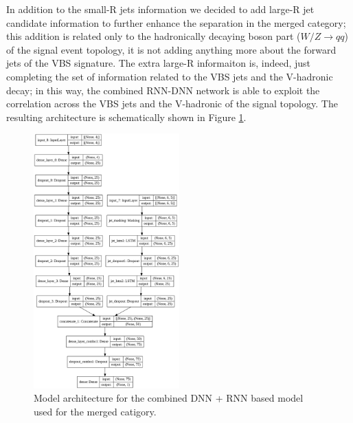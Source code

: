 In addition to the small-R jets information we decided to add large-R jet candidate information to further enhance the separation in the merged category; this addition is related only to the hadronically decaying boson part ($W/Z \rightarrow qq$) of the signal event topology, it is not adding anything more about the forward jets of the VBS signature.
The extra large-R informaiton is, indeed, just completing the set of information related to the VBS jets and the V-hadronic decay; in this way, the combined RNN-DNN network is able to exploit the correlation across the VBS jets and the V-hadronic of the signal topology.
The resulting architecture is schematically shown in Figure \ref{fig:RNNComboArch}.
\begin{figure}[ht]
      \centering
       \includegraphics[width=0.5\textwidth]{figures/RNN/model_plot.png}
       \caption{Model architecture for the combined DNN + RNN based model used for the merged catigory.}
       \label{fig:RNNComboArch}
\end{figure}

